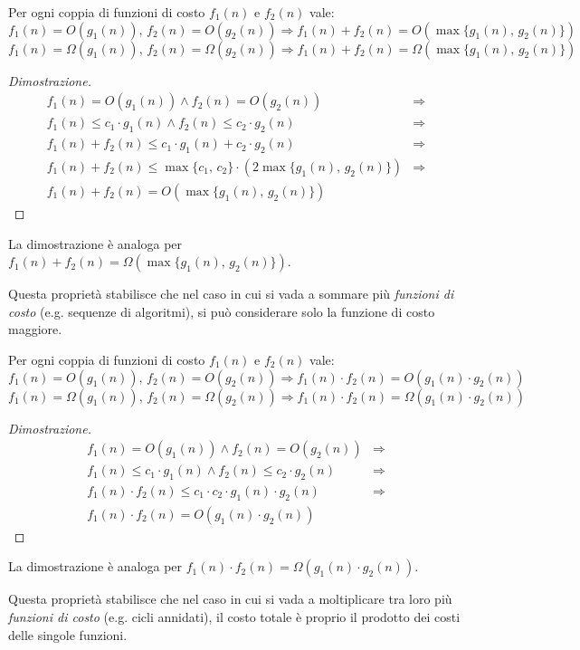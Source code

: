 \begin{definition}
    Per ogni coppia di funzioni di costo $f_1(n)$ e $f_2(n)$ vale:
    \[f_1(n)=O(g_1(n)),\,f_2(n)=O(g_2(n))\Rightarrow f_1(n)+f_2(n)=
    O(\max\{g_1(n),\,g_2(n)\})\]
    \[f_1(n)=\Omega(g_1(n)),\,f_2(n)=\Omega(g_2(n))\Rightarrow f_1(n)+f_2(n)=
    \Omega(\max\{g_1(n),\,g_2(n)\})\]
\end{definition}
\begin{proof}[Dimostrazione]
    \[\begin{array}{rc}
        f_1(n)=O(g_1(n))\wedge f_2(n)=O(g_2(n)) & \Rightarrow\\
        f_1(n)\leq c_1\cdot g_1(n)\wedge f_2(n)\leq c_2\cdot g_2(n) & \Rightarrow\\
        f_1(n)+f_2(n)\leq c_1\cdot g_1(n)+c_2\cdot g_2(n) & \Rightarrow\\
        f_1(n)+f_2(n)\leq\max\{c_1,\,c_2\}\cdot(2\max\{g_1(n),\,g_2(n)\}) & \Rightarrow\\
        f_1(n)+f_2(n)=O(\max\{g_1(n),\,g_2(n)\})
    \end{array}\]
\end{proof}
\begin{note}
    La dimostrazione è analoga per $f_1(n)+f_2(n)=\Omega(\max\{g_1(n),\,g_2(n)\})$.
\end{note}\noindent
Questa proprietà stabilisce che nel caso in cui si vada a sommare più
\emph{funzioni di costo} (e.g. sequenze di algoritmi), si può considerare solo
la funzione di costo maggiore.

\begin{definition}
    Per ogni coppia di funzioni di costo $f_1(n)$ e $f_2(n)$ vale:
    \[f_1(n)=O(g_1(n)),\,f_2(n)=O(g_2(n))\Rightarrow f_1(n)\cdot f_2(n)=
    O(g_1(n)\cdot g_2(n))\]
    \[f_1(n)=\Omega(g_1(n)),\,f_2(n)=\Omega(g_2(n))\Rightarrow f_1(n)\cdot f_2(n)=
    \Omega(g_1(n)\cdot g_2(n))\]
\end{definition}
\begin{proof}[Dimostrazione]
    \[\begin{array}{rc}
        f_1(n)=O(g_1(n))\wedge f_2(n)=O(g_2(n)) & \Rightarrow\\
        f_1(n)\leq c_1\cdot g_1(n)\wedge f_2(n)\leq c_2\cdot g_2(n) & \Rightarrow\\
        f_1(n)\cdot f_2(n)\leq c_1\cdot c_2\cdot g_1(n)\cdot g_2(n) & \Rightarrow\\
        f_1(n)\cdot f_2(n)=O(g_1(n)\cdot g_2(n))
    \end{array}\]
\end{proof}
\begin{note}
    La dimostrazione è analoga per $f_1(n)\cdot f_2(n)=\Omega(g_1(n)\cdot g_2(n))$.
\end{note}\noindent
Questa proprietà stabilisce che nel caso in cui si vada a moltiplicare tra loro più
\emph{funzioni di costo} (e.g. cicli annidati), il costo totale è proprio il
prodotto dei costi delle singole funzioni.

